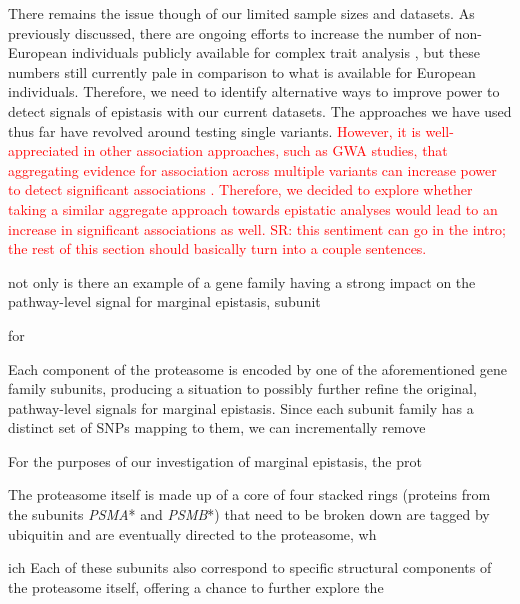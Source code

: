 \documentclass[12pt,a4paper]{article}
\newcommand{\red}[1]{\textcolor{red}{#1}}
\begin{document}
There remains the issue though of our limited sample sizes and datasets. As previously discussed, there are ongoing efforts to increase the number of non-European individuals publicly available for complex trait analysis \citep{Matise2011,Kowalski2019}, but these numbers still currently pale in comparison to what is available for European individuals. Therefore, we need to identify alternative ways to improve power to detect signals of epistasis with our current datasets. The approaches we have used thus far have revolved around testing single variants. {\red{However, it is well-appreciated in other association approaches, such as GWA studies, that aggregating evidence for association across multiple variants can increase power to detect significant associations \citep{Cantor2010,Wang2010,Oldmeadow2011,Ramanan2012,Chimusa2019,White2019}. Therefore, we decided to explore whether taking a similar aggregate approach towards epistatic analyses would lead to an increase in significant associations as well. SR: this sentiment can go in the intro; the rest of this section should basically turn into a couple sentences.}} 











not only is there an example of a gene family having a strong impact on the pathway-level signal for marginal epistasis, subunit  

for 






Each component of the proteasome is encoded by one of the aforementioned gene family subunits, producing a situation to possibly further refine the original, pathway-level signals for marginal epistasis. Since each subunit family has a distinct set of SNPs mapping to them, we can incrementally remove 

For the purposes of our investigation of marginal epistasis, the prot


The proteasome itself is made up of a core of four stacked rings (proteins from the subunits \textit{PSMA}* and \textit{PSMB}*) that need to be broken down are tagged by ubiquitin and are eventually directed to the proteasome, wh

ich  Each of these subunits also correspond to specific structural components of the proteasome itself, offering a chance to further explore the 
\end{document}
